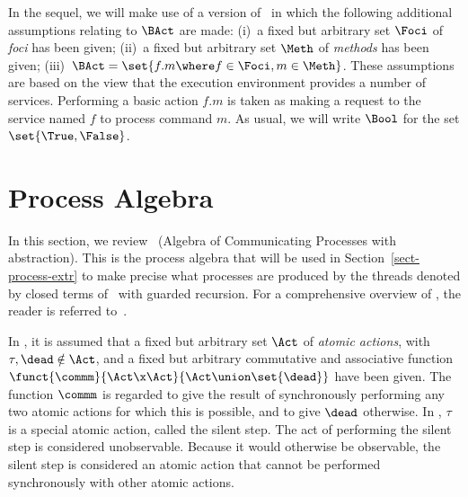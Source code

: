 \documentclass[fleqn]{llncs}
\begin{document}
In the sequel, we will make use of a version of \BTA\ in which the
following additional assumptions relating to $\BAct$ are made:
(i)~a fixed but arbitrary set $\Foci$ of \emph{foci} has been given;
(ii)~a fixed but arbitrary set $\Meth$ of \emph{methods} has been given;
(iii)~$\BAct = \set{f.m \where f \in \Foci, m \in \Meth}$.
These assumptions are based on the view that the execution environment
provides a number of services.
Performing a basic action $f.m$ is taken as making a request to the
service named $f$ to process command $m$.
As usual, we will write $\Bool$ for the set $\set{\True,\False}$.

\section{Process Algebra}
\label{sect-ACP}

In this section, we review \ACPt\ (Algebra of Communicating Processes
with abstraction).
This is the process algebra that will be used in
Section~\ref{sect-process-extr} to make precise what processes are
produced by the threads denoted by closed terms of \BTA\ with guarded
recursion.
For a comprehensive overview of \ACPt, the reader is referred
to~\cite{BW90,Fok00}.

In \ACPt, it is assumed that a fixed but arbitrary set $\Act$ of
\emph{atomic actions}, with $\tau,\dead \notin \Act$, and a fixed but
arbitrary commutative and associative function
$\funct{\commm}{\Act \x \Act}{\Act \union \set{\dead}}$
have been given.
The function $\commm$ is regarded to give the result of synchronously
performing any two atomic actions for which this is possible, and to
give $\dead$ otherwise.
In \ACPt, $\tau$ is a special atomic action, called the silent step.
The act of performing the silent step is considered unobservable.
Because it would otherwise be observable, the silent step is considered
an atomic action that cannot be performed synchronously with other
atomic actions.
\end{document}
